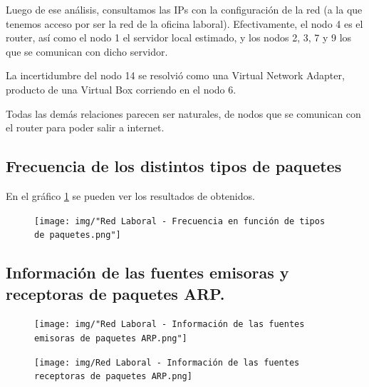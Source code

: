 Luego de ese análisis, consultamos las IPs con la configuración de la red (a la que tenemos acceso por ser la red de la oficina laboral). Efectivamente, el nodo 4 es el router, así como el nodo 1 el servidor local estimado, y los nodos 2, 3, 7 y 9 los que se comunican con dicho servidor.

La incertidumbre del nodo 14 se resolvió como una Virtual Network Adapter, producto de una Virtual Box corriendo en el nodo 6.

Todas las demás relaciones parecen ser naturales, de nodos que se comunican con el router para poder salir a internet.

\subsection{Frecuencia de los distintos tipos de paquetes}

En el gráfico \ref{laboral:paquetes} se pueden ver los resultados de obtenidos.

\begin{figure}[h!]
    \centering                                                       
    \texttt{[image: img/"Red Laboral - Frecuencia en función de tipos de paquetes.png"]}
    \caption{}
    \label{laboral:paquetes}
\end{figure}

\subsection{Información de las fuentes emisoras y receptoras de paquetes ARP.}

\begin{figure}[h!]
    \centering                                                       
    \texttt{[image: img/"Red Laboral - Información de las fuentes emisoras de paquetes ARP.png"]}
    \caption{}
    \label{laboral:emisoras}
\end{figure}

\begin{figure}[h!]
    \centering                                                       
    \texttt{[image: img/Red Laboral - Información de las fuentes receptoras de paquetes ARP.png]}
    \caption{}
    \label{laboral:receptoras}
\end{figure}

